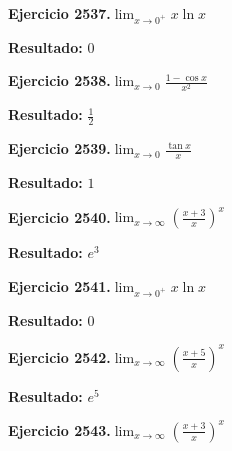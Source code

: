 \documentclass[10pt,a4paper]{article}
\begin{document}
\begin{ejbox}
\textbf{Ejercicio 2537.}\quad $\lim_{x\to 0^+} x\ln x$
\end{ejbox}

\begin{solbox}
\textbf{Resultado:} \(\displaystyle 0\)
\end{solbox}

\newpage
\begin{ejbox}
\textbf{Ejercicio 2538.}\quad $\lim_{x\to 0} \frac{1-\cos x}{x^2}$
\end{ejbox}

\begin{solbox}
\textbf{Resultado:} \(\displaystyle \frac{1}{2}\)
\end{solbox}

\begin{ejbox}
\textbf{Ejercicio 2539.}\quad $\lim_{x\to 0} \frac{\tan x}{x}$
\end{ejbox}

\begin{solbox}
\textbf{Resultado:} \(\displaystyle 1\)
\end{solbox}

\begin{ejbox}
\textbf{Ejercicio 2540.}\quad $\lim_{x\to \infty} \left(\frac{x+3}{x}\right)^{x}$
\end{ejbox}

\begin{solbox}
\textbf{Resultado:} \(\displaystyle e^{3}\)
\end{solbox}

\newpage
\begin{ejbox}
\textbf{Ejercicio 2541.}\quad $\lim_{x\to 0^+} x\ln x$
\end{ejbox}

\begin{solbox}
\textbf{Resultado:} \(\displaystyle 0\)
\end{solbox}

\begin{ejbox}
\textbf{Ejercicio 2542.}\quad $\lim_{x\to \infty} \left(\frac{x+5}{x}\right)^{x}$
\end{ejbox}

\begin{solbox}
\textbf{Resultado:} \(\displaystyle e^{5}\)
\end{solbox}

\begin{ejbox}
\textbf{Ejercicio 2543.}\quad $\lim_{x\to \infty} \left(\frac{x+3}{x}\right)^{x}$
\end{ejbox}
\end{document}
